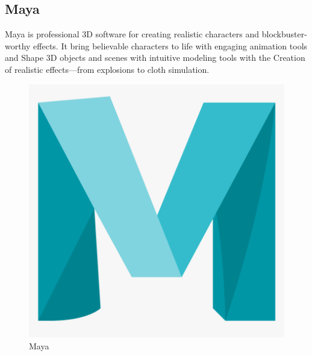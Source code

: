 \documentclass[12pt]{book}
\begin{document}
\subsection{Maya}
Maya is professional 3D software for creating realistic characters and blockbuster-worthy effects.
It bring believable characters to life with engaging animation tools and Shape 3D objects and scenes with intuitive modeling tools with the Creation of realistic effects—from explosions to cloth simulation.
\begin{figure}[!h]
    \centering
    \includegraphics[scale=0.08]{./Figures/Images/maya.png}
    \caption{Maya}
    \label{Maya}
\end{figure}
\end{document}
